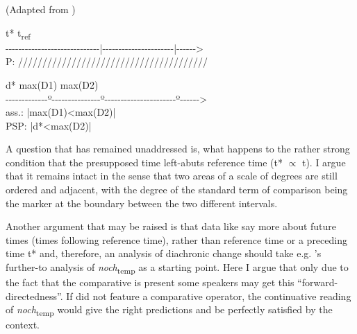 \documentclass[output=paper]{langsci/langscibook}
\begin{document}
\ea\label{diagram_temp_comp}
\ea (Adapted from \citealt{beck2016a_sub})\\\noindent\parbox[t]{\linewidth}{\hspace{43pt} t* \hspace{80pt} t\textsubscript{ref}\\
{-}{-}{-}{-}{-}{-}{-}{-}{-}{-}{-}{-}{-}{-}{-}{-}{-}{-}{-}{-}{-}{-}{-}{-}{-}{-}{-}{-}{-}{|}{-}{-}{-}{-}{-}{-}{-}{-}{-}{-}{-}{-}{-}{-}{-}{-}{-}{-}{-}{-}{-}{-}{|}{-}{-}{-}{-}{-}{-}>\\
P: \hspace{40pt}///////////////////////////////////////\\}
\ex \noindent\parbox[t]{\linewidth}{\hspace{43pt} d* \hspace{30pt} max(D1) \hspace{42pt} max(D2)\\
{-}{-}{-}{-}{-}{-}{-}{-}{-}{-}{-}{-}{-}{º}{-}{-}{-}{-}{-}{-}{-}{-}{-}{-}{-}{-}{-}{-}{-}{º}{-}{-}{-}{-}{-}{-}{-}{-}{-}{-}{-}{-}{-}{-}{-}{-}{-}{-}{-}{-}{-}{-}{º}{-}{-}{-}{-}{-}{-}>\\
ass.: \hspace{85pt}|\hspace{1.125pt}max(D1)<max(D2)\hspace{1.125pt}|\\
PSP: \hspace{25pt}|\hspace{1pt}d*<max(D2)\hspace{1pt}|}
\z\z


A question that has remained unaddressed is, what happens to the rather strong condition that the presupposed time left-abuts reference time (t* $\propto$ t). I argue that it remains intact in the sense that two areas of a scale of degrees are still ordered and adjacent, with the degree of the standard term of comparison being the marker at the boundary between the two different intervals.

Another argument that may be raised is that data like  say more about future times (times following reference time), rather than reference time or a preceding time t* and, therefore, an analysis of diachronic change should take e.g. \citeauthor{beck2016a_sub}'s \citeyearpar{beck2016a_sub} further-to analysis of \textit{noch}\textsubscript{temp} as a starting point. Here I argue that only due to the fact that the comparative is present some speakers may get this ``forward-directedness''. If  did not feature a comparative operator, the continuative reading of \textit{noch}\textsubscript{temp} would give the right predictions and be perfectly satisfied by the context.
\end{document}
